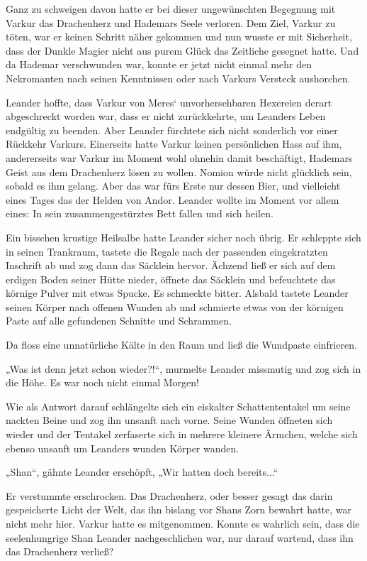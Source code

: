 \documentclass[10pt, a4paper, oneside]{book}
\begin{document}
Ganz zu schweigen davon hatte er bei dieser ungewünschten Begegnung mit Varkur das Drachenherz und Hademars Seele verloren. Dem Ziel, Varkur zu töten, war er keinen Schritt näher gekommen und nun wusste er mit Sicherheit, dass der Dunkle Magier nicht aus purem Glück das Zeitliche gesegnet hatte. Und da Hademar verschwunden war, konnte er jetzt nicht einmal mehr den Nekromanten nach seinen Kenntnissen oder nach Varkurs Versteck aushorchen.

Leander hoffte, dass Varkur von Meres‘ unvorhersehbaren Hexereien derart abgeschreckt worden war, dass er nicht zurückkehrte, um Leanders Leben endgültig zu beenden. Aber Leander fürchtete sich nicht sonderlich vor einer Rückkehr Varkurs. Einerseits hatte Varkur keinen persönlichen Hass auf ihm, andererseits war Varkur im Moment wohl ohnehin damit beschäftigt, Hademars Geist aus dem Drachenherz lösen zu wollen. Nomion würde nicht glücklich sein, sobald es ihm gelang. Aber das war fürs Erste nur dessen Bier, und vielleicht eines Tages das der Helden von Andor. Leander wollte im Moment vor allem eines: In sein zusammengestürztes Bett fallen und sich heilen.

Ein bisschen krustige Heilsalbe hatte Leander sicher noch übrig. Er schleppte sich in seinen Trankraum, tastete die Regale nach der passenden eingekratzten Inschrift ab und zog dann das Säcklein hervor. Ächzend ließ er sich auf dem erdigen Boden seiner Hütte nieder, öffnete das Säcklein und befeuchtete das körnige Pulver mit etwas Spucke. Es schmeckte bitter. Alsbald tastete Leander seinen Körper nach offenen Wunden ab und schmierte etwas von der körnigen Paste auf alle gefundenen Schnitte und Schrammen.

Da floss eine unnatürliche Kälte in den Raum und ließ die Wundpaste einfrieren.

„Was ist denn jetzt schon wieder?!“, murmelte Leander missmutig und zog sich in die Höhe. Es war noch nicht einmal Morgen!

Wie als Antwort darauf schlängelte sich ein eiskalter Schattententakel um seine nackten Beine und zog ihn unsanft nach vorne. Seine Wunden öffneten sich wieder und der Tentakel zerfaserte sich in mehrere kleinere Ärmchen, welche sich ebenso unsanft um Leanders wunden Körper wanden.

„Shan“, gähnte Leander erschöpft, „Wir hatten doch bereits...“

Er verstummte erschrocken. Das Drachenherz, oder besser gesagt das darin gespeicherte Licht der Welt, das ihn bislang vor Shans Zorn bewahrt hatte, war nicht mehr hier. Varkur hatte es mitgenommen. Konnte es wahrlich sein, dass die seelenhungrige Shan Leander nachgeschlichen war, nur darauf wartend, dass ihn das Drachenherz verließ?
\end{document}
